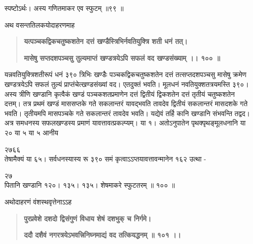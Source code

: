 \documentclass[11pt, openany]{book}
\begin{document}
\begin{sloppypar}
\hangindent=0.2in \hspace{0.2in}स्पष्टोऽर्थः। अस्य गणितमाकर एव स्फुटम् ॥९९ ॥

\hangindent=0.2in \hspace{0.2in}अथ वसन्ततिलकयोदाहरणमाह\textendash
\begin{quote}
\textbf{यत्पञ्चकद्विकचतुष्कशतेन दत्तं खण्डैस्त्रिभिर्नवतियुक्त्रि शती धनं तत्।}

\textbf{मासेषु सप्तदशपञ्चसु तुल्यमाप्तं खण्डत्रयेऽपि सफलं वद खण्डसंख्याम् ।। १०० ॥}
\end{quote}

\hangindent=0.2in \hspace{0.2in}यन्नवतियुक्त्रिशतीरूपं धनं ३९० त्रिभिः खण्डैः पञ्चकद्विकचतुष्कशतेन दत्तं तत्सप्तदशपञ्चसु मासेषु क्रमेण खण्डत्रयेऽपि सफलं तुल्यं प्राप्तंचेत्खण्डसंख्यां वद। एतदुक्तं भवति। मूलधनं नवतियुक्शतत्रयमस्ति ३९०। अस्य त्रीणि खण्डानि कृत्वैकं खण्डं पञ्चकशतप्रमाणेन दत्तं द्वितीयं द्विकशतेन दत्तं तृतीयं चतुष्कशतेन दत्तम्। तत्र प्रथमं खण्डं माससप्तके गते सकलान्तरं यावद्भवति तावदेव द्वितीयं सकलान्तरं मासदशके गते भवति। तृतीयमपि मासपञ्चके गते सकलान्तरं तावदेव भवति। यद्येवं तर्हि कानि खण्डानि संभवन्ति तद्वद। अत्र समधनस्य सफलखण्डस्य प्रमाणं यावत्तावत्प्रकल्प्यम्। या १। अतोऽनुपातेन पृथक्पृथङ्मूलधनानि या २० या ५ या ५ आनीय 

\hspace{4in}२७\hspace{0.25in}६\hspace{0.25in}६\\

\hangindent=0.2in तेषामैक्यं या ६५। सर्वधनस्यास्य रू ३९० समं कृत्वाऽऽप्तयावत्तावन्मानेन १६२ उत्था -

\hspace{0.8in}२७\\

\hangindent=0.2in पितानि खण्डानि १२०। १३५। १३५। शेषमाकरे स्फुटतरम् ॥ १०० ॥

\hangindent=0.2in \hspace{0.2in}अथोदाहरणं वंशस्थवृत्तेनाऽऽह\textendash

\begin{quote}
\hspace{0.5in}\textbf{पुरप्रवेशे दशदो द्विसंगुणं विधाय शेषं दशभुक् च निर्गमे।}

\hspace{0.5in}\textbf{ददौ दशैवं नगरत्रयेऽभवत्त्रिनिघ्नमाद्यं वद तत्कियद्धनम् ॥ १०१ ।।}
\end{quote}


\end{sloppypar}
\end{document}
